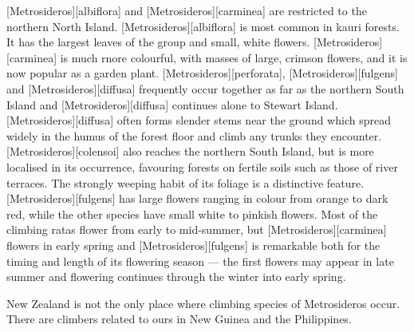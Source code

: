 [Metrosideros][albiflora] and [Metrosideros][carminea] are restricted to the northern North Island. [Metrosideros][albiflora] is most common in kauri forests.
It has the largest leaves of the group and small, white flowers. [Metrosideros][carminea] is much rnore colourful, with masses of large, crimson flowers, and it is now popular as a garden plant. [Metrosideros][perforata], [Metrosideros][fulgens] and [Metrosideros][diffusa] frequently occur together as far as the northern South Island and [Metrosideros][diffusa] continues alone to Stewart Island. [Metrosideros][diffusa] often forms slender stems near the ground which spread widely in the humus of the forest floor and climb any trunks they encounter. [Metrosideros][colensoi] also reaches the northern South Island, but is more localised in its occurrence, favouring forests on fertile soils such as those of river terraces.
The strongly weeping habit of its foliage is a distinctive feature. [Metrosideros][fulgens] has large flowers ranging in colour from orange to dark red, while the other species have small white to pinkish flowers.
Most of the climbing ratas flower from early to mid-summer, but [Metrosideros][carminea] flowers in early spring and [Metrosideros][fulgens] is remarkable both for the timing and length of its flowering season --- the first flowers may appear in late summer and flowering continues through the winter into early spring.

New Zealand is not the only place where climbing species of Metrosideros occur.
There are climbers related to ours in New Guinea and the Philippines.

